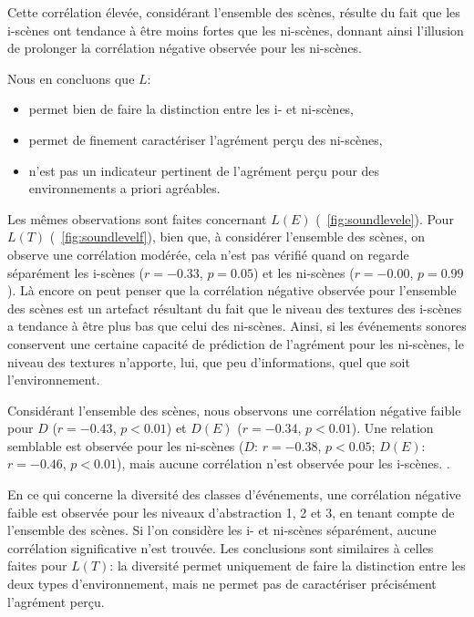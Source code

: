 Cette corrélation élevée, considérant l'ensemble des scènes, résulte du fait que les i-scènes ont tendance à être moins fortes que les ni-scènes, donnant ainsi l'illusion de prolonger la corrélation négative observée pour les ni-scènes.  

Nous en concluons que $L$:

\begin{itemize}
\item permet bien de faire la distinction entre les i- et ni-scènes,
\item permet de finement caractériser l'agrément perçu des ni-scènes,
\item n'est pas un indicateur pertinent de l'agrément perçu pour des environnements a priori agréables.
\end{itemize}

Les mêmes observations sont faites concernant $L(E)$ (\cf~\ref{fig:soundlevele}). Pour $L(T)$ (\cf~\ref{fig:soundlevelf}), bien que, à considérer l'ensemble des scènes, on observe une corrélation modérée, cela n'est pas vérifié quand on regarde séparément les i-scènes ($r=-0.33$, $p=0.05$) et les ni-scènes ($r=-0.00$, $p=0.99$). Là encore on peut penser que la corrélation négative observée pour l'ensemble des scènes est un artefact résultant du fait que le niveau des textures des i-scènes a tendance à être plus bas que celui des ni-scènes. Ainsi, si les événements sonores conservent une certaine capacité de prédiction de l'agrément pour les ni-scènes, le niveau des textures n'apporte, lui, que peu d'informations, quel que soit l'environnement.

Considérant l'ensemble des scènes, nous observons une corrélation négative faible pour $D$ ($r=-0.43$, $p<0.01$) et $D(E)$ ($r=-0.34$, $p<0.01$). Une relation semblable est observée pour les ni-scènes ($D$: $r=-0.38$, $p<0.05$; $D(E)$: $r=-0.46$, $p<0.01$), mais aucune corrélation n'est observée pour les i-scènes.  .

En ce qui concerne la diversité des classes d'événements, une corrélation négative faible est observée pour les niveaux d'abstraction 1, 2 et 3, en tenant compte de l'ensemble des scènes. Si l'on considère les i- et ni-scènes séparément, aucune corrélation significative n'est trouvée. Les conclusions sont similaires à celles faites pour $L(T)$: la diversité permet uniquement de faire la distinction entre les deux types d'environnement, mais ne permet pas de caractériser précisément l'agrément perçu.

